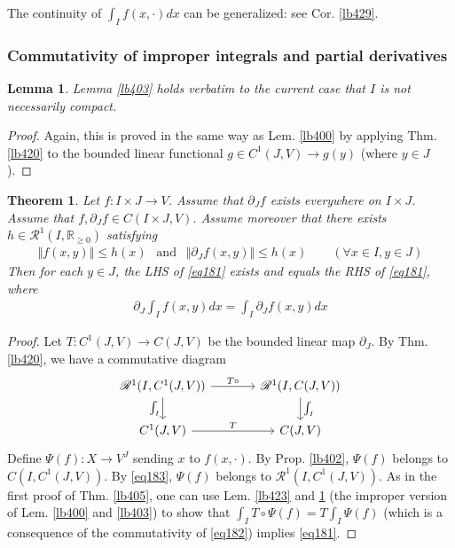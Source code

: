 \documentclass[12pt,b5paper,notitlepage]{article}
\theoremstyle{definition}
\theoremstyle{plain}
\newtheorem{thm}[df]{Theorem}
\newtheorem{lm}[df]{Lemma}
\newcommand{\scr}{\mathscr}
\newcommand{\Rbb}{\mathbb R}
\numberwithin{equation}{section}
\begin{document}
The continuity of $\int_If(x,\cdot)dx$ can be generalized: see Cor. \ref{lb429}.



\subsubsection{Commutativity of improper integrals and partial derivatives}


\begin{lm}\label{lb426}
Lemma \ref{lb403} holds verbatim to the current case that $I$ is not necessarily compact.
\end{lm}

\begin{proof}
Again, this is proved in the same way as Lem. \ref{lb400} by applying Thm. \ref{lb420} to the bounded linear functional $g\in C^1(J,V)\rightarrow g(y)$ (where $y\in J$).
\end{proof}


\begin{thm}\label{lb434}
Let $f:I\times J\rightarrow V$. Assume that $\partial_Jf$ exists everywhere on $I\times J$. Assume that $f,\partial_J f\in C(I\times J,V)$. Assume moreover that there exists $h\in\scr R^1(I,\Rbb_{\geq0})$ satisfying
\begin{align}\label{eq183}
\Vert f(x,y)\Vert\leq h(x)~~\text{ and }~~\Vert\partial_Jf(x,y)\Vert\leq h(x)\qquad(\forall x\in I,y\in J)
\end{align}
Then for each $y\in J$, the LHS of \eqref{eq181} exists and equals the RHS of \eqref{eq181}, where
\begin{align}
\partial_J\int_I f(x,y)dx=\int_I\partial_J f(x,y)dx  \label{eq181}
\end{align}
\end{thm}


\begin{proof}
Let $T:C^1(J,V)\rightarrow C(J,V)$ be the bounded linear map $\partial_J$. By Thm. \ref{lb420}, we have a commutative diagram
\begin{equation}\label{eq182}
\begin{tikzcd}[column sep=large]
\scr R^1(I,C^1(J,V)) \arrow[r,"T\circ"] \arrow[d,"\int_I"'] & \scr R^1(I,C(J,V)) \arrow[d,"\int_I"] \\
C^1(J,V) \arrow[r,"T"]           & C(J,V)      
\end{tikzcd} 
\end{equation}
Define $\Psi(f):X\rightarrow V^J$ sending $x$ to $f(x,\cdot)$. By Prop. \ref{lb402}, $\Psi(f)$ belongs to $C(I,C^1(J,V))$. By \eqref{eq183}, $\Psi(f)$ belongs to $\scr R^1(I,C^1(J,V))$. As in the first proof of Thm. \ref{lb405}, one can use Lem. \ref{lb423} and  \ref{lb426} (the improper version of Lem. \ref{lb400} and \ref{lb403}) to show that  $\int_I T\circ\Psi(f)=T\int_I\Psi(f)$ (which is a consequence of the commutativity of \eqref{eq182}) implies \eqref{eq181}.
\end{proof}
\end{document}
